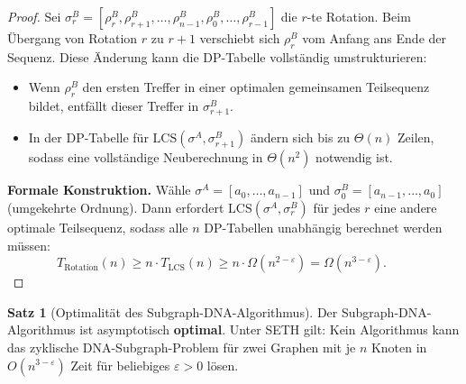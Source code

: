 ﻿\documentclass[a4paper,12pt]{article}
\theoremstyle{definition}
\newtheorem{satz}{Satz}
\begin{document}
\begin{proof}
    Sei $\sigma^B_r = [\rho_r^B, \rho_{r+1}^B, \ldots, \rho_{n-1}^B,
    \rho_0^B, \ldots, \rho_{r-1}^B]$ die $r$-te Rotation.
    Beim Übergang von Rotation $r$ zu $r+1$ verschiebt sich $\rho_r^B$
    vom Anfang ans Ende der Sequenz. Diese Änderung kann die DP-Tabelle
    vollständig umstrukturieren:
    \begin{itemize}
        \item Wenn $\rho_r^B$ den ersten Treffer in einer optimalen gemeinsamen
              Teilsequenz bildet, entfällt dieser Treffer in $\sigma^B_{r+1}$.
        \item In der DP-Tabelle für $\mathrm{LCS}(\sigma^A, \sigma^B_{r+1})$
              ändern sich bis zu $\Theta(n)$ Zeilen, sodass eine vollständige
              Neuberechnung in $\Theta(n^2)$ notwendig ist.
    \end{itemize}

    \textbf{Formale Konstruktion.}
    Wähle $\sigma^A = [a_0, \ldots, a_{n-1}]$ und
    $\sigma^B_0 = [a_{n-1}, \ldots, a_0]$ (umgekehrte Ordnung).
    Dann erfordert $\mathrm{LCS}(\sigma^A, \sigma^B_r)$ für jedes $r$ eine
    andere optimale Teilsequenz, sodass alle $n$ DP-Tabellen unabhängig
    berechnet werden müssen:
    \[
        T_{\text{Rotation}}(n) \geq n \cdot T_{\mathrm{LCS}}(n)
        \geq n \cdot \Omega(n^{2-\varepsilon}) = \Omega(n^{3-\varepsilon}).
        \qquad 
    \]
\end{proof}

\begin{satz}[Optimalität des Subgraph-DNA-Algorithmus]
    \label{satz:optimalitaet}
    Der Subgraph-DNA-Algorithmus ist asymptotisch \textbf{optimal}.
    Unter SETH gilt: Kein Algorithmus kann das zyklische DNA-Subgraph-Problem
    für zwei Graphen mit je $n$ Knoten in $O(n^{3-\varepsilon})$ Zeit für
    beliebiges $\varepsilon > 0$ lösen.
\end{satz}
\end{document}
